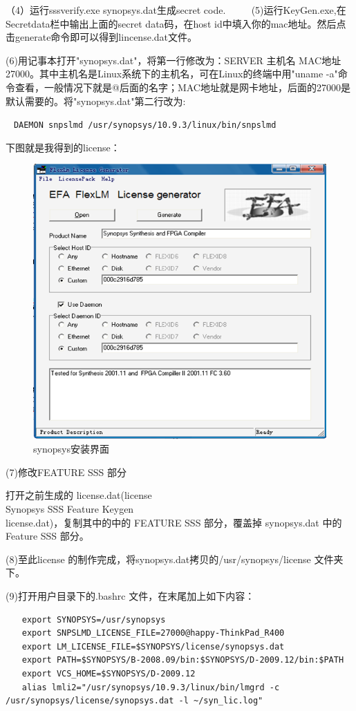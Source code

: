 （4）运行sssverify.exe synopsys.dat生成secret code.
　　
(5)运行KeyGen.exe,在Secretdata栏中输出上面的secret data码，在host id中填入你的mac地址。然后点击generate命令即可以得到lincense.dat文件。

(6)用记事本打开"synopsys.dat"，将第一行修改为：SERVER 主机名 MAC地址27000。其中主机名是Linux系统下的主机名，可在Linux的终端中用"uname -a"命令查看，一般情况下就是@后面的名字；MAC地址就是网卡地址，后面的27000是默认需要的。将"synopsys.dat"第二行改为:

\verb"　DAEMON snpslmd /usr/synopsys/10.9.3/linux/bin/snpslmd"

下图就是我得到的license：
\begin{figure}
\centering\includegraphics[scale=0.5]{figures/synopsys5.png}
\caption{synopsys安装界面}\label{synopsys5}
\end{figure}

(7)修改FEATURE SSS 部分

打开之前生成的 license.dat(license\\Synopsys SSS Feature Keygen\\license.dat)，复制其中的中的 FEATURE SSS 部分，覆盖掉 synopsys.dat 中的 Feature SSS 部分。

(8)至此license 的制作完成，将synopsys.dat拷贝的/usr/synopsys/license 文件夹下。

(9)打开用户目录下的.bashrc 文件，在末尾加上如下内容：
\begin{verbatim}
　　export SYNOPSYS=/usr/synopsys
　　export SNPSLMD_LICENSE_FILE=27000@happy-ThinkPad_R400
　　export LM_LICENSE_FILE=$SYNOPSYS/license/synopsys.dat
　　export PATH=$SYNOPSYS/B-2008.09/bin:$SYNOPSYS/D-2009.12/bin:$PATH
　　export VCS_HOME=$SYNOPSYS/D-2009.12
　　alias lmli2="/usr/synopsys/10.9.3/linux/bin/lmgrd -c /usr/synopsys/license/synopsys.dat -l ~/syn_lic.log"
\end{verbatim}

